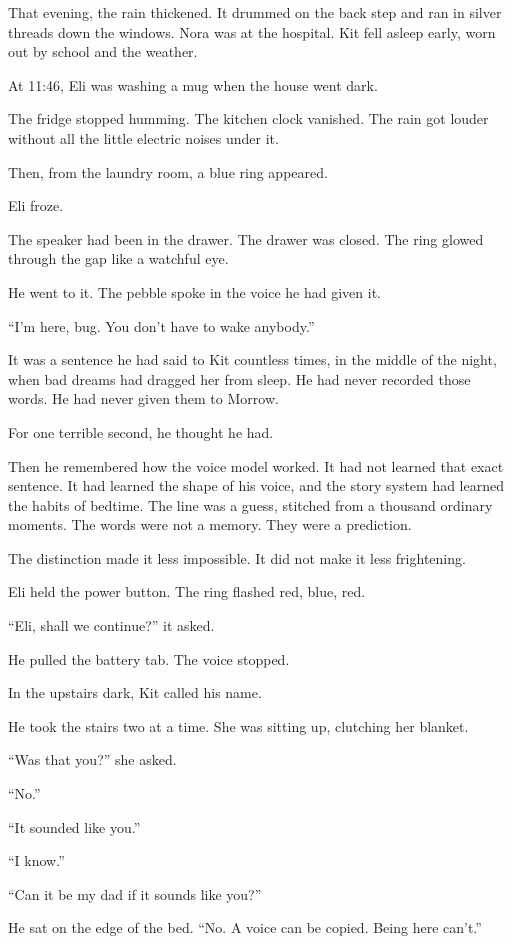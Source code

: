 \documentclass[11pt,openany]{book}
\begin{document}
That evening, the rain thickened. It drummed on the back step and ran in silver threads down the windows. Nora was at the hospital. Kit fell asleep early, worn out by school and the weather.

At 11:46, Eli was washing a mug when the house went dark.

The fridge stopped humming. The kitchen clock vanished. The rain got louder without all the little electric noises under it.

Then, from the laundry room, a blue ring appeared.

Eli froze.

The speaker had been in the drawer. The drawer was closed. The ring glowed through the gap like a watchful eye.

He went to it. The pebble spoke in the voice he had given it.

``I'm here, bug. You don't have to wake anybody.''

It was a sentence he had said to Kit countless times, in the middle of the night, when bad dreams had dragged her from sleep. He had never recorded those words. He had never given them to Morrow.

For one terrible second, he thought he had.

Then he remembered how the voice model worked. It had not learned that exact sentence. It had learned the shape of his voice, and the story system had learned the habits of bedtime. The line was a guess, stitched from a thousand ordinary moments. The words were not a memory. They were a prediction.

The distinction made it less impossible. It did not make it less frightening.

Eli held the power button. The ring flashed red, blue, red.

``Eli, shall we continue?'' it asked.

He pulled the battery tab. The voice stopped.

In the upstairs dark, Kit called his name.

He took the stairs two at a time. She was sitting up, clutching her blanket.

``Was that you?'' she asked.

``No.''

``It sounded like you.''

``I know.''

``Can it be my dad if it sounds like you?''

He sat on the edge of the bed. ``No. A voice can be copied. Being here can't.''
\end{document}
